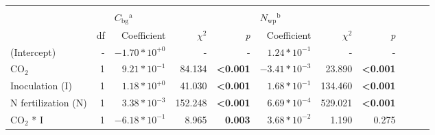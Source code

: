 \begin{landscape}
\begin{table}
{\begin{tabular}{p{3cm}p{0.5cm}p{1.75cm}p{1.5cm}p{1.5cm}p{1.75cm}p{1.5cm}p{1.5cm}p{1.75cm}p{1.5cm}p{1.5cm}}
            &&&&&&&&&&
            \\

            &&  \multicolumn{3}{l}{$C_\mathrm{bg}{}^\mathrm{a}$} 
            &   \multicolumn{3}{l}{$N_\mathrm{wp}{}^\mathrm{b}$} 
            &&& \\
            \hline
            & \multicolumn{1}{r}{df}
            & \multicolumn{1}{r}{Coefficient}   & \multicolumn{1}{r}{$\chi^2$}    & \multicolumn{1}{r}{\textit{p}} 
            & \multicolumn{1}{r}{Coefficient}   & \multicolumn{1}{r}{$\chi^2$}    & \multicolumn{1}{r}{\textit{p}} 
            \\
            \hline

            (Intercept) & \multicolumn{1}{r}{-}
            & \multicolumn{1}{r}{$-1.70*10^{+0}$}     & \multicolumn{1}{r}{-}             & \multicolumn{1}{r}{-}
            & \multicolumn{1}{r}{$1.24*10^{-1}$}    & \multicolumn{1}{r}{-}             & \multicolumn{1}{r}{-}
            &&&
            \\

            CO$_2$ & \multicolumn{1}{r}{1}
            & \multicolumn{1}{r}{$9.21*10^{-1}$}    & \multicolumn{1}{r}{84.134}        & \multicolumn{1}{r}{\textbf{<0.001}}
            & \multicolumn{1}{r}{$-3.41*10^{-3}$}   & \multicolumn{1}{r}{23.890}        & \multicolumn{1}{r}{\textbf{<0.001}}
            &&&
            \\

            Inoculation (I) & \multicolumn{1}{r}{1}
            & \multicolumn{1}{r}{$1.18*10^{+0}$}      & \multicolumn{1}{r}{41.030}        & \multicolumn{1}{r}{\textbf{<0.001}}
            & \multicolumn{1}{r}{$1.68*10^{-1}$}    & \multicolumn{1}{r}{134.460}       & \multicolumn{1}{r}{\textbf{<0.001}}
            &&&
            \\

            N fertilization (N) & \multicolumn{1}{r}{1}
            & \multicolumn{1}{r}{$3.38*10^{-3}$}    & \multicolumn{1}{r}{152.248}       & \multicolumn{1}{r}{\textbf{<0.001}}
            & \multicolumn{1}{r}{$6.69*10^{-4}$}    & \multicolumn{1}{r}{529.021}       & \multicolumn{1}{r}{\textbf{<0.001}}
            &&&
            \\

            CO$_2$ * I & \multicolumn{1}{r}{1}
            & \multicolumn{1}{r}{$-6.18*10^{-1}$}   & \multicolumn{1}{r}{8.965}         & \multicolumn{1}{r}{\textbf{0.003}}
            & \multicolumn{1}{r}{$3.68*10^{-2}$}    & \multicolumn{1}{r}{1.190}         & \multicolumn{1}{r}{0.275}
            &&& \multicolumn{1}{r}{}
            \\


\end{tabular}}
\end{table}
\end{landscape}
